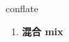 
\begin{frame}
{\huge conflate}
\begin{center}
\begin{enumerate}\Large
  \item \textbf{混合 mix}
\end{enumerate}
\end{center}
\end{frame}
